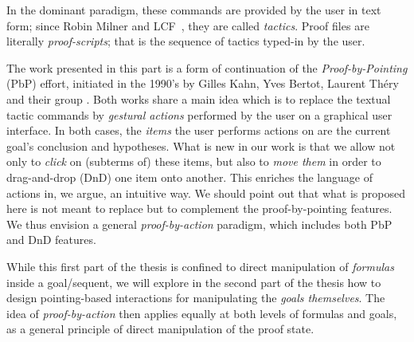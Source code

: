In the dominant paradigm, these commands are provided by the user in
text form; since Robin Milner and
LCF~\cite{doi:10.1098/rsta.1984.0067}, they are called {\em
tactics}. Proof files are literally {\em proof-scripts}; that is the
sequence of tactics typed-in by the user.
	
	The work presented in this part is a form of continuation of the
	\emph{Proof-by-Pointing} (PbP) effort, initiated in the 1990's by Gilles Kahn,
	Yves Bertot, Laurent Théry and their group \cite{PbP}. Both works share a main
	idea which is to replace the textual tactic commands by {\em gestural actions}
	performed by the user on a graphical user interface. In both cases, the {\em
	items} the user performs actions on are the current goal's conclusion and
	hypotheses. What is new in our work is that we allow not only to {\em click}
	on (subterms of) these items, but also to {\em move them} in order to
	drag-and-drop (DnD) one item onto another. This enriches the language of
	actions in, we argue, an intuitive way. We should point out that what is
	proposed here is not meant to replace but to complement the proof-by-pointing
	features. We thus envision a general {\em proof-by-action} paradigm, which
	includes both PbP and DnD features.

While this first part of the thesis is confined to direct manipulation of
\emph{formulas} inside a goal/sequent, we will explore in the second part of the
thesis how to design pointing-based interactions for manipulating the
\emph{goals themselves}. The idea of \emph{proof-by-action} then applies equally
at both levels of formulas and goals, as a general principle of direct
manipulation of the proof state.









